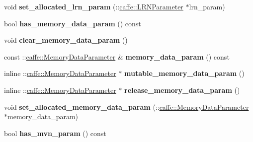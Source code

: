 \begin{DoxyCompactItemize}
void {\bfseries set\+\_\+allocated\+\_\+lrn\+\_\+param} (\+::\mbox{\hyperlink{classcaffe_1_1_l_r_n_parameter}{caffe\+::\+L\+R\+N\+Parameter}} $\ast$lrn\+\_\+param)
\item 
\mbox{\label{classcaffe_1_1_v1_layer_parameter_a44a827a983a124084c7a9bfffd8fa124}} 
bool {\bfseries has\+\_\+memory\+\_\+data\+\_\+param} () const
\item 
\mbox{\label{classcaffe_1_1_v1_layer_parameter_a6018de577cb536a65ca29dde8671a9e6}} 
void {\bfseries clear\+\_\+memory\+\_\+data\+\_\+param} ()
\item 
\mbox{\label{classcaffe_1_1_v1_layer_parameter_a8319cbb458b2e22e854d66ad0f4ba2f4}} 
const \+::\mbox{\hyperlink{classcaffe_1_1_memory_data_parameter}{caffe\+::\+Memory\+Data\+Parameter}} \& {\bfseries memory\+\_\+data\+\_\+param} () const
\item 
\mbox{\label{classcaffe_1_1_v1_layer_parameter_a6f63fc15930b3c2d2ff639d46b2d53a2}} 
inline \+::\mbox{\hyperlink{classcaffe_1_1_memory_data_parameter}{caffe\+::\+Memory\+Data\+Parameter}} $\ast$ {\bfseries mutable\+\_\+memory\+\_\+data\+\_\+param} ()
\item 
\mbox{\label{classcaffe_1_1_v1_layer_parameter_a25426bb9fd4a2ab1fa6b3622325855e6}} 
inline \+::\mbox{\hyperlink{classcaffe_1_1_memory_data_parameter}{caffe\+::\+Memory\+Data\+Parameter}} $\ast$ {\bfseries release\+\_\+memory\+\_\+data\+\_\+param} ()
\item 
\mbox{\label{classcaffe_1_1_v1_layer_parameter_a66e33c91761a6639a3a1eeefbf9d0236}} 
void {\bfseries set\+\_\+allocated\+\_\+memory\+\_\+data\+\_\+param} (\+::\mbox{\hyperlink{classcaffe_1_1_memory_data_parameter}{caffe\+::\+Memory\+Data\+Parameter}} $\ast$memory\+\_\+data\+\_\+param)
\item 
\mbox{\label{classcaffe_1_1_v1_layer_parameter_a59706aefd579671dcb845ba91e3ef0a5}} 
bool {\bfseries has\+\_\+mvn\+\_\+param} () const
\item 
\mbox{\label{classcaffe_1_1_v1_layer_parameter_a017de11f3821e89648a1c0fe0a183890}} 

\end{DoxyCompactItemize}
